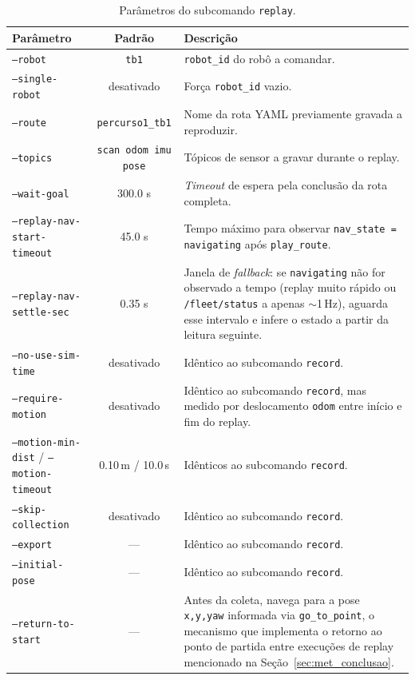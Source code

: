 \begin{table}[H]
\centering
\caption{Parâmetros do subcomando \texttt{replay}.}
\begin{tabularx}{\textwidth}{lcX}
\toprule
\textbf{Parâmetro} & \textbf{Padrão} & \textbf{Descrição} \\
\midrule
\texttt{--robot} & \texttt{tb1} & \texttt{robot\_\allowbreak id} do robô a comandar. \\
\texttt{--single-robot} & desativado & Força \texttt{robot\_\allowbreak id} vazio. \\
\texttt{--route} & \texttt{percurso1\_\allowbreak tb1} & Nome da rota YAML previamente gravada a reproduzir. \\
\texttt{--topics} & \texttt{scan odom imu pose} & Tópicos de sensor a gravar durante o replay. \\
\texttt{--wait-goal} & 300.0 s & \textit{Timeout} de espera pela conclusão da rota completa. \\
\texttt{--replay-nav-start-timeout} & 45.0 s & Tempo máximo para observar \texttt{nav\_\allowbreak state = navigating} após \texttt{play\_\allowbreak route}. \\
\texttt{--replay-nav-settle-sec} & 0.35 s & Janela de \textit{fallback}: se \texttt{navigating} não for observado a tempo (replay muito rápido ou \texttt{/\allowbreak fleet/\allowbreak status} a apenas $\sim$1\,Hz), aguarda esse intervalo e infere o estado a partir da leitura seguinte. \\
\texttt{--no-use-sim-time} & desativado & Idêntico ao subcomando \texttt{record}. \\
\texttt{--require-motion} & desativado & Idêntico ao subcomando \texttt{record}, mas medido por deslocamento \texttt{odom} entre início e fim do replay. \\
\texttt{--motion-min-dist} / \texttt{--motion-timeout} & 0.10\,m / 10.0\,s & Idênticos ao subcomando \texttt{record}. \\
\texttt{--skip-collection} & desativado & Idêntico ao subcomando \texttt{record}. \\
\texttt{--export} & --- & Idêntico ao subcomando \texttt{record}. \\
\texttt{--initial-pose} & --- & Idêntico ao subcomando \texttt{record}. \\
\texttt{--return-to-start} & --- & Antes da coleta, navega para a pose \texttt{x,y,yaw} informada via \texttt{go\_\allowbreak to\_\allowbreak point}, o mecanismo que implementa o retorno ao ponto de partida entre execuções de replay mencionado na Seção~\ref{sec:met_conclusao}. \\
\bottomrule
\end{tabularx}
\end{table}

